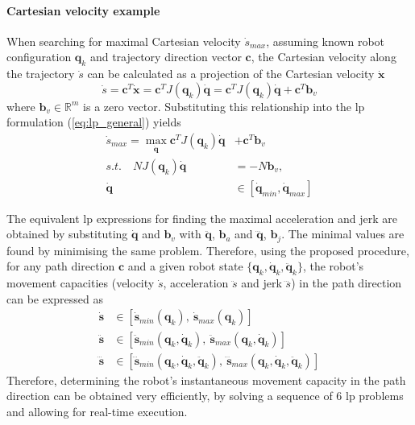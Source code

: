 \paragraph*{Cartesian velocity example} When searching for maximal Cartesian velocity $\dot{s}_{max}$, assuming known robot configuration $\bm{q}_k$ and trajectory direction vector $\bm{c}$, the Cartesian velocity along the trajectory $\dot{s}$ can be calculated as a projection of the Cartesian velocity $\dot{\bm{x}}$ 
\begin{equation}
    \dot{s} = \bm{c}^T\dot{\bm{x}}= \bm{c}^TJ(\bm{q}_k)\dot{\bm{q}} = \bm{c}^TJ(\bm{q}_k)\dot{\bm{q}} + \bm{c}^T\bm{b}_v
\end{equation}
where $\bm{b}_v \in \mathbb{R}^m$ is a zero vector. Substituting this relationship into the \gls{lp} formulation (\ref{eq:lp_general}) yields 
\begin{equation}
\begin{split}
    \dot{s}_{max} = \max_{\dot{\bm{q}}} \bm{c}^TJ(\bm{q}_k)\dot{\bm{q}} &+ \bm{c}^T\bm{b}_v  \\
    s.t.\quad NJ(\bm{q}_k)\dot{\bm{q}} &= - N\bm{b}_v, \\
    \dot{\bm{q}}&\in [\dot{\bm{q}}_{min}, \dot{\bm{q}}_{max}]
\end{split}\label{eq:lp_vel_max}
\end{equation}

The equivalent \gls{lp} expressions for finding the maximal acceleration and jerk are obtained by substituting $\dot{\bm{q}}$ and $\bm{b}_v$ with $\ddot{\bm{q}}$, $\bm{b}_a$ and $\dddot{\bm{q}}$, $\bm{b}_j$. The minimal values are found by minimising the same problem.
Therefore, using the proposed procedure, for any path direction $\bm{c}$ and a given robot state $\{\bm{q}_k, \dot{\bm{q}}_k, \ddot{\bm{q}}_k\}$, the robot's movement capacities (velocity $\dot{s}$, acceleration $\ddot{s}$ and jerk $\dddot{s}$) in the path direction can be expressed as
\begin{equation}
\begin{split}
    \dot{\bm{s}} &\in [\dot{\bm{s}}_{min}(\bm{q}_k),~ \dot{\bm{s}}_{max}(\bm{q}_k) ]\\
    \ddot{\bm{s}} &\in [\ddot{\bm{s}}_{min}(\bm{q}_k, \dot{\bm{q}}_k),~ \ddot{\bm{s}}_{max}(\bm{q}_k, \dot{\bm{q}}_k) ]\\
    \dddot{\bm{s}} &\in [\dddot{\bm{s}}_{min}(\bm{q}_k, \dot{\bm{q}}_k, \ddot{\bm{q}}_k),~ \dddot{\bm{s}}_{max}(\bm{q}_k, \dot{\bm{q}}_k, \ddot{\bm{q}}_k) ]
\end{split}
\label{eq:range_in_path_direction}
\end{equation}
Therefore, determining the robot's instantaneous movement capacity in the path direction can be obtained very efficiently, by solving a sequence of 6 \gls{lp} problems and allowing for real-time execution.

